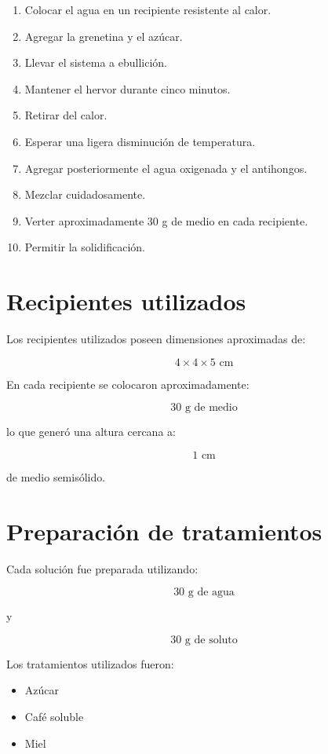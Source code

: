 \documentclass[compacto,10pt,comentarios]{aleph-notas}
\begin{document}
\begin{enumerate}
\item Colocar el agua en un recipiente resistente al calor.
\item Agregar la grenetina y el azúcar.
\item Llevar el sistema a ebullición.
\item Mantener el hervor durante cinco minutos.
\item Retirar del calor.
\item Esperar una ligera disminución de temperatura.
\item Agregar posteriormente el agua oxigenada y el antihongos.
\item Mezclar cuidadosamente.
\item Verter aproximadamente 30 g de medio en cada recipiente.
\item Permitir la solidificación.
\end{enumerate}

\section{Recipientes utilizados}

Los recipientes utilizados poseen dimensiones aproximadas de:

\[
4 \times 4 \times 5 \text{ cm}
\]

En cada recipiente se colocaron aproximadamente:

\[
30 \text{ g de medio}
\]

lo que generó una altura cercana a:

\[
1 \text{ cm}
\]

de medio semisólido.

\section{Preparación de tratamientos}

Cada solución fue preparada utilizando:

\[
30 \text{ g de agua}
\]

y

\[
30 \text{ g de soluto}
\]

Los tratamientos utilizados fueron:

\begin{itemize}
\item Azúcar
\item Café soluble
\item Miel
\end{itemize}
\end{document}
